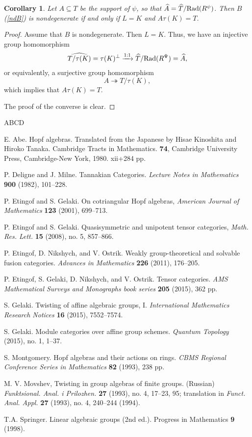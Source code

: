 \documentclass{amsart}
\newtheorem{corollary}[theorem]{Corollary}
\theoremstyle{definition}
\numberwithin{equation}{section}
\begin{document}
\begin{corollary}
Let $A\subseteq T$ be the support of $\psi$, so that $\widehat{A}=\widehat{T}/{\rm Rad}(R^{\psi})$. Then $B$ (\ref{ndB}) is nondegenerate if and only if $L=K$ and $A\tau(K)=T$.
\end{corollary}

\begin{proof}
Assume that $B$ is nondegenerate. Then $L=K$. 
Thus, we have an injective group homomorphism 
$$\widehat{T/\tau(K)}=\tau(K)^{\perp}\xrightarrow{1:1}\widehat{T}/{\rm Rad}(R^{\Psi})=\widehat{A},$$
or equivalently, a surjective group homomorphism 
$$A \twoheadrightarrow T/\tau(K),$$
which implies that $A\tau(K)=T$.

The proof of the converse is clear.
\end{proof}

\begin{thebibliography}{ABCD}

 E. Abe. Hopf algebras. Translated from the Japanese by Hisae
Kinoshita and Hiroko Tanaka. Cambridge Tracts in Mathematics. 
{\bf 74}, Cambridge University Press, Cambridge-New York, 1980. xii+284 pp.

 P. Deligne and J. Milne. Tannakian Categories. {\em Lecture Notes in Mathematics} {\bf 900}
(1982), 101--228.

 P. Etingof and S. Gelaki. On cotriangular Hopf algebras, {\em American Journal of Mathematics} {\bf 123} (2001), 699--713.

 P. Etingof and S. Gelaki. Quasisymmetric and unipotent tensor categories, {\em Math. Res. Lett.} {\bf 15} (2008), no. 5, 857--866.

 P. Etingof, D. Nikshych, and V. Ostrik. Weakly group-theoretical and solvable fusion categories. {\em Advances in Mathematics} {\bf 226} (2011), 
176--205.

P. Etingof, S. Gelaki, D. Nikshych, and V. Ostrik. Tensor categories. {\em AMS Mathematical Surveys and Monographs book series} {\bf 205} (2015), 362 pp. 

 S. Gelaki. Twisting of affine algebraic groups, I. {\em International Mathematics Research Notices} 
{\bf 16} (2015), 7552--7574.

 S. Gelaki. Module categories over affine group schemes. {\em Quantum Topology} (2015), no. 1, 1--37.

 S. Montgomery. Hopf algebras and their actions on rings. {\em CBMS Regional Conference Series in Mathematics} {\bf 82} (1993), 238 pp.

M. V. Movshev, Twisting in group algebras of finite groups. (Russian) {\em Funktsional. Anal. i Prilozhen.} {\bf 27} (1993), no. 4, 17--23, 95; translation in {\em Funct. Anal. Appl.} {\bf 27} (1993), no. 4, 240--244 (1994). 

 T.A. Springer. Linear algebraic groups (2nd ed.). Progress in Mathematics {\bf 9} (1998).
\end{thebibliography}
\end{document}
